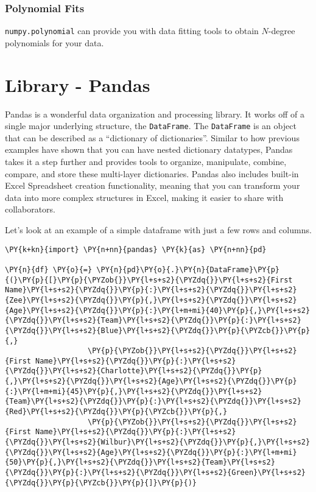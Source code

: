 \hypertarget{polynomial-fits}{%
\subsubsection{Polynomial Fits}\label{polynomial-fits}}

\texttt{numpy.polynomial} can provide you with data fitting tools to
obtain \(N\)-degree polynomials for your data.
\section{Library - Pandas}
Pandas is a wonderful data organization and processing library. It works
off of a single major underlying structure, the \texttt{DataFrame}. The
\texttt{DataFrame} is an object that can be described as a ``dictionary
of dictionaries''. Similar to how previous examples have shown that you
can have nested dictionary datatypes, Pandas takes it a step further and
provides tools to organize, manipulate, combine, compare, and store
these multi-layer dictionaries. Pandas also includes built-in Excel
Spreadsheet creation functionality, meaning that you can transform your
data into more complex structures in Excel, making it easier to share
with collaborators.

Let's look at an example of a simple dataframe with just a few rows and
columns.

    \begin{tcolorbox}[breakable, size=fbox, boxrule=1pt, pad at break*=1mm,colback=cellbackground, colframe=cellborder]
\begin{Verbatim}[commandchars=\\\{\}]
\PY{k+kn}{import} \PY{n+nn}{pandas} \PY{k}{as} \PY{n+nn}{pd}

\PY{n}{df} \PY{o}{=} \PY{n}{pd}\PY{o}{.}\PY{n}{DataFrame}\PY{p}{(}\PY{p}{[}\PY{p}{\PYZob{}}\PY{l+s+s2}{\PYZdq{}}\PY{l+s+s2}{First Name}\PY{l+s+s2}{\PYZdq{}}\PY{p}{:}\PY{l+s+s2}{\PYZdq{}}\PY{l+s+s2}{Zee}\PY{l+s+s2}{\PYZdq{}}\PY{p}{,}\PY{l+s+s2}{\PYZdq{}}\PY{l+s+s2}{Age}\PY{l+s+s2}{\PYZdq{}}\PY{p}{:}\PY{l+m+mi}{40}\PY{p}{,}\PY{l+s+s2}{\PYZdq{}}\PY{l+s+s2}{Team}\PY{l+s+s2}{\PYZdq{}}\PY{p}{:}\PY{l+s+s2}{\PYZdq{}}\PY{l+s+s2}{Blue}\PY{l+s+s2}{\PYZdq{}}\PY{p}{\PYZcb{}}\PY{p}{,}
                   \PY{p}{\PYZob{}}\PY{l+s+s2}{\PYZdq{}}\PY{l+s+s2}{First Name}\PY{l+s+s2}{\PYZdq{}}\PY{p}{:}\PY{l+s+s2}{\PYZdq{}}\PY{l+s+s2}{Charlotte}\PY{l+s+s2}{\PYZdq{}}\PY{p}{,}\PY{l+s+s2}{\PYZdq{}}\PY{l+s+s2}{Age}\PY{l+s+s2}{\PYZdq{}}\PY{p}{:}\PY{l+m+mi}{45}\PY{p}{,}\PY{l+s+s2}{\PYZdq{}}\PY{l+s+s2}{Team}\PY{l+s+s2}{\PYZdq{}}\PY{p}{:}\PY{l+s+s2}{\PYZdq{}}\PY{l+s+s2}{Red}\PY{l+s+s2}{\PYZdq{}}\PY{p}{\PYZcb{}}\PY{p}{,}
                   \PY{p}{\PYZob{}}\PY{l+s+s2}{\PYZdq{}}\PY{l+s+s2}{First Name}\PY{l+s+s2}{\PYZdq{}}\PY{p}{:}\PY{l+s+s2}{\PYZdq{}}\PY{l+s+s2}{Wilbur}\PY{l+s+s2}{\PYZdq{}}\PY{p}{,}\PY{l+s+s2}{\PYZdq{}}\PY{l+s+s2}{Age}\PY{l+s+s2}{\PYZdq{}}\PY{p}{:}\PY{l+m+mi}{50}\PY{p}{,}\PY{l+s+s2}{\PYZdq{}}\PY{l+s+s2}{Team}\PY{l+s+s2}{\PYZdq{}}\PY{p}{:}\PY{l+s+s2}{\PYZdq{}}\PY{l+s+s2}{Green}\PY{l+s+s2}{\PYZdq{}}\PY{p}{\PYZcb{}}\PY{p}{]}\PY{p}{)}
\end{Verbatim}
\end{tcolorbox}

